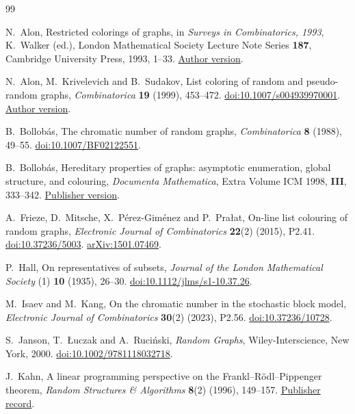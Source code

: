 \documentclass[11pt]{article}
\numberwithin{equation}{section}
\begin{document}
\begin{thebibliography}{99}
\small
\raggedright

N.~Alon, Restricted colorings of graphs, in \emph{Surveys in Combinatorics, 1993}, K.~Walker (ed.), London Mathematical Society Lecture Note Series \textbf{187}, Cambridge University Press, 1993, 1--33. \href{https://web.math.princeton.edu/~nalon/PDFS/british2.pdf}{Author version}.

N.~Alon, M.~Krivelevich and B.~Sudakov, List coloring of random and pseudo-random graphs, \emph{Combinatorica} \textbf{19} (1999), 453--472. \href{https://doi.org/10.1007/s004939970001}{doi:10.1007/s004939970001}. \href{https://web.math.princeton.edu/~nalon/PDFS/colaks9.pdf}{Author version}.

B.~Bollob\'as, The chromatic number of random graphs, \emph{Combinatorica} \textbf{8} (1988), 49--55. \href{https://doi.org/10.1007/BF02122551}{doi:10.1007/BF02122551}.

B.~Bollob\'as, Hereditary properties of graphs: asymptotic enumeration, global structure, and colouring, \emph{Documenta Mathematica}, Extra Volume ICM 1998, \textbf{III}, 333--342. \href{https://ems.press/content/book-chapter-files/27247?nt=1}{Publisher version}.

A.~Frieze, D.~Mitsche, X.~P\'erez-Gim\'enez and P.~Pra{\l}at, On-line list colouring of random graphs, \emph{Electronic Journal of Combinatorics} \textbf{22}(2) (2015), P2.41. \href{https://doi.org/10.37236/5003}{doi:10.37236/5003}. \href{https://arxiv.org/abs/1501.07469}{arXiv:1501.07469}.

P.~Hall, On representatives of subsets, \emph{Journal of the London Mathematical Society} (1) \textbf{10} (1935), 26--30. \href{https://doi.org/10.1112/jlms/s1-10.37.26}{doi:10.1112/jlms/s1-10.37.26}.

M.~Isaev and M.~Kang, On the chromatic number in the stochastic block model, \emph{Electronic Journal of Combinatorics} \textbf{30}(2) (2023), P2.56. \href{https://doi.org/10.37236/10728}{doi:10.37236/10728}.

S.~Janson, T.~\L uczak and A.~Ruci\'nski, \emph{Random Graphs}, Wiley-Interscience, New York, 2000. \href{https://doi.org/10.1002/9781118032718}{doi:10.1002/9781118032718}.

J.~Kahn, A linear programming perspective on the Frankl--R\"odl--Pippenger theorem, \emph{Random Structures \& Algorithms} \textbf{8}(2) (1996), 149--157. \href{https://onlinelibrary.wiley.com/doi/abs/10.1002/%28SICI%291098-2418%28199603%298%3A2%3C149%3A%3AAID-RSA5%3E3.0.CO%3B2-Y}{Publisher record}.


\end{thebibliography}
\end{document}
